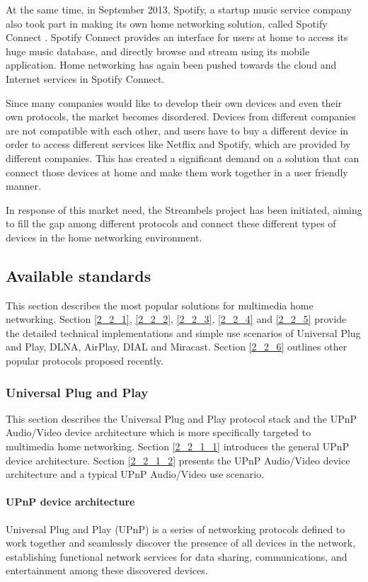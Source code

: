 At the same time, in September 2013, Spotify, a startup music service 
company also took part in making its own home networking solution, called 
Spotify Connect \cite{spotifyconnect}. Spotify Connect provides an interface for
users at home to access its huge music database, and directly browse and stream
using its mobile application. Home networking has again been pushed towards the
cloud and Internet services in Spotify Connect.

Since many companies would like to develop their own devices and even their 
own protocols, the market becomes disordered. Devices from different companies
are not compatible with each other, and users have to buy a different device in
order to access different services like Netflix and Spotify, which are provided
by different companies. This has created a significant demand on a solution that
can connect those devices at home and make them work together in a user friendly manner.

In response of this market need, the Streambels project has been initiated,
aiming to fill the gap among different protocols and connect these different types of devices in the home networking environment.
\subsection{Available standards\label{2_2}} 
This section describes the most popular solutions for multimedia home networking. Section \ref{2_2_1}, \ref{2_2_2}, \ref{2_2_3}, \ref{2_2_4} and \ref{2_2_5} provide the detailed technical implementations and simple use scenarios of Universal Plug and Play, DLNA, AirPlay, DIAL and Miracast. Section \ref{2_2_6} outlines other popular protocols proposed recently.
\subsubsection[Universal Plug and Play]{Universal Plug and Play\label{2_2_1}}
This section describes the Universal Plug and Play protocol stack and the UPnP
Audio/Video device architecture which is more specifically targeted to
multimedia home networking. Section \ref{2_2_1_1} introduces the general UPnP device architecture. Section \ref{2_2_1_2} presents the UPnP Audio/Video device architecture and a typical UPnP Audio/Video use scenario.
\paragraph{UPnP device architecture\label{2_2_1_1}}
Universal Plug and Play (UPnP) is a series of networking protocols defined to 
work together and seamlessly discover the presence of all devices in the
network, establishing functional network services for data sharing,
communications, and entertainment among these discovered devices.


